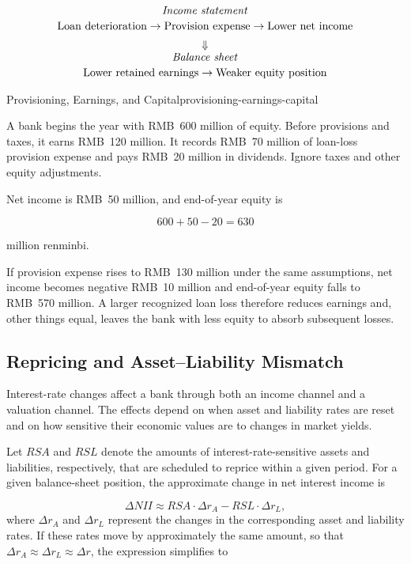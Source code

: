 \[
\begin{array}{c}
\text{\emph{Income statement}} \\[2pt]
\text{Loan deterioration}
\rightarrow
\text{Provision expense}
\rightarrow
\text{Lower net income}
\\[5pt]
\Downarrow
\\[-1pt]
\text{\emph{Balance sheet}} \\[2pt]
\text{Lower retained earnings}
\rightarrow
\text{Weaker equity position}
\end{array}
\]

\begin{example}{Provisioning, Earnings, and Capital}{provisioning-earnings-capital}

A bank begins the year with RMB~600 million of equity. Before provisions and taxes, it earns RMB~120 million. It records RMB~70 million of loan-loss provision expense and pays RMB~20 million in dividends. Ignore taxes and other equity adjustments.

Net income is RMB~50 million, and end-of-year equity is

\[
600+50-20=630
\]

million renminbi.

If provision expense rises to RMB~130 million under the same assumptions, net income becomes negative RMB~10 million and end-of-year equity falls to RMB~570 million. A larger recognized loan loss therefore reduces earnings and, other things equal, leaves the bank with less equity to absorb subsequent losses.

\end{example}

\subsection{Repricing and Asset--Liability Mismatch}

Interest-rate changes affect a bank through both an income channel and a valuation channel. The effects depend on when asset and liability rates are reset and on how sensitive their economic values are to changes in market yields.

Let $\textit{RSA}$ and $\textit{RSL}$ denote the amounts of interest-rate-sensitive
assets and liabilities, respectively, that are scheduled to reprice
within a given period. For a given balance-sheet position, the
approximate change in net interest income is

\begin{equation}
\Delta \textit{NII}\approx \textit{RSA}\cdot\Delta r_A
-RSL\cdot\Delta r_L,
\end{equation}
where $\Delta r_A$ and $\Delta r_L$ represent the changes in the
corresponding asset and liability rates. If these rates move by
approximately the same amount, so that
$\Delta r_A\approx\Delta r_L\approx\Delta r$, the expression
simplifies to

